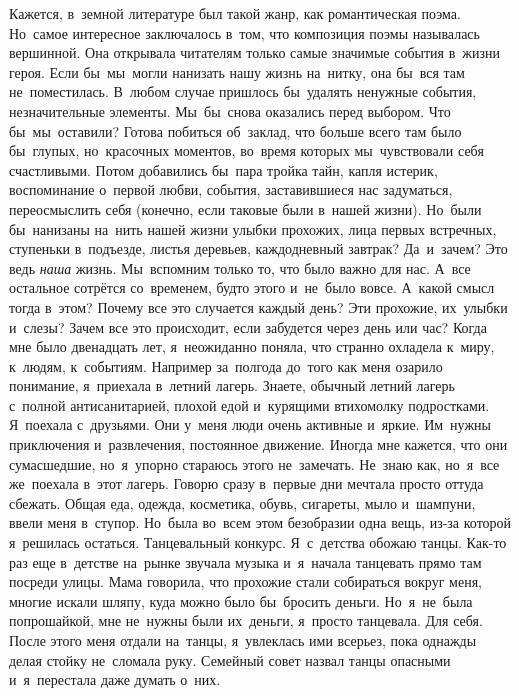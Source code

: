 \lettrine[lines=3, loversize=0.1]{К}{}ажется, в~земной литературе был такой жанр, как романтическая поэма.
Но~самое интересное заключалось в~том, что композиция поэмы называлась вершинной.
Она открывала читателям только самые значимые события в~жизни героя.
Если бы~мы~могли нанизать нашу жизнь на~нитку, она бы~вся там не~поместилась.
В~любом случае пришлось бы~удалять ненужные события, незначительные элементы.
Мы~бы~снова оказались перед выбором.
Что бы~мы~оставили? Готова побиться об~заклад, что больше всего там было бы~глупых, но~красочных моментов, во~время которых мы~чувствовали себя счастливыми.
Потом добавились бы~пара тройка тайн, капля истерик, воспоминание о~первой любви, события, заставившиеся нас задуматься, переосмыслить себя (конечно, если таковые были в~нашей жизни).
Но~были бы~нанизаны на~нить нашей жизни улыбки прохожих, лица первых встречных, ступеньки в~подъезде, листья деревьев, каждодневный завтрак? Да~и~зачем? Это ведь \textit{наша} жизнь.
Мы~вспомним только то, что было важно для нас.
А~все остальное сотрётся со~временем, будто этого и~не~было вовсе.
А~какой смысл тогда в~этом? Почему все это случается каждый день? Эти прохожие, их~улыбки и~слезы? Зачем все это происходит, если забудется через день или час?
\clearpage
\chaps{***} 
\lettrine[lines=3, loversize=0.1]{К}{}огда мне было двенадцать лет, я~неожиданно поняла, что странно охладела к~миру, к~людям, к~событиям.
Например за~полгода до~того как меня озарило понимание, я~приехала в~летний лагерь.
Знаете, обычный летний лагерь с~полной антисанитарией, плохой едой и~курящими втихомолку подростками.
Я~поехала с~друзьями.
Они у~меня люди очень активные и~яркие.
Им~нужны приключения и~развлечения, постоянное движение.
Иногда мне кажется, что они сумасшедшие, но~я~упорно стараюсь этого не~замечать.
Не~знаю как, но~я~все же~поехала в~этот лагерь.
Говорю сразу в~первые дни мечтала просто оттуда сбежать.
Общая еда, одежда, косметика, обувь, сигареты, мыло и~шампуни, ввели меня в~ступор.
Но~была во~всем этом безобразии одна вещь, из-за которой я~решилась остаться.
Танцевальный конкурс.
Я~с~детства обожаю танцы.
Как-то раз еще в~детстве на~рынке звучала музыка и~я~начала танцевать прямо там посреди улицы.
Мама говорила, что прохожие стали собираться вокруг меня, многие искали шляпу, куда можно было бы~бросить деньги.
Но~я~не~была попрошайкой, мне не~нужны были их~деньги, я~просто танцевала.
Для себя.
После этого меня отдали на~танцы, я~увлеклась ими всерьез, пока однажды делая стойку не~сломала руку.
Семейный совет назвал танцы опасными и~я~перестала даже думать о~них.
